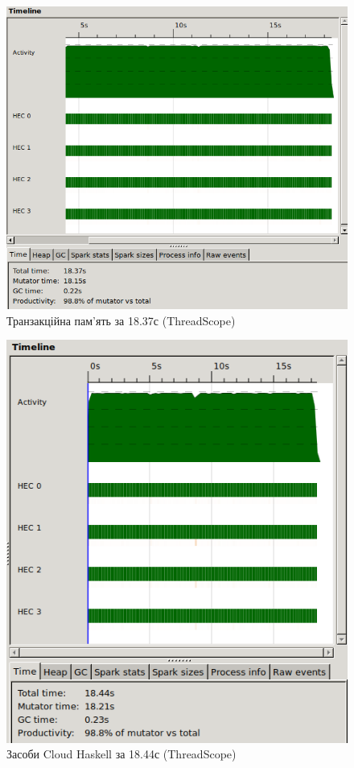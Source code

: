\documentclass[12pt]{article}
\begin{document}
\begin{figure}[H]
  \includegraphics[width=\linewidth]{main2.png}
  \centering
  \caption{Транзакційна пам'ять за 18.37с (ThreadScope)}
\end{figure}

\begin{figure}[H]
  \includegraphics[width=\linewidth]{main3.png}
  \centering
  \caption{Засоби Cloud Haskell за 18.44с (ThreadScope)}
\end{figure}
\end{document}
